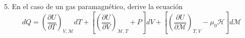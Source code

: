 5. En el caso de un gas paramagnético, derive la ecuación
$$
dQ=\left(\frac{\partial U}{\partial T}\right)_{V, \mathscr{M}} d T+\left[\left(\frac{\partial U}{\partial V}\right)_{\mathscr{M}, T}+P\right] d V+\left[\left(\frac{\partial U}{\partial \mathscr{M}}\right)_{T, V}-\mu_0 \mathscr{H}\right] d \mathscr{M}
$$